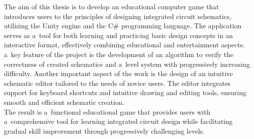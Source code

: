 The aim of this thesis is to develop an educational computer game
that introduces users to the principles of designing integrated circuit schematics,
utilizing the Unity engine and the C\# programming language.
The application serves as a~tool for both learning and practicing basic design concepts in an interactive format,
effectively combining educational and entertainment aspects.\\
\indent a~key feature of the project is the development of an algorithm to verify the correctness of created schematics
and a~level system with progressively increasing difficulty.
Another important aspect of the work is the design of an intuitive schematic editor tailored to the needs of novice users.
The editor integrates support for keyboard shortcuts and intuitive drawing and editing tools,
ensuring smooth and efficient schematic creation.\\
\indent The result is a~functional educational game that provides users with a~comprehensive tool
for learning integrated circuit design while
facilitating gradual skill improvement through progressively challenging levels.
